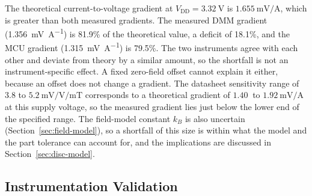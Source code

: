 \documentclass[12pt,a4paper]{article}
\begin{document}
\begin{figure}[H]
\begin{minipage}[t]{0.48\textwidth}

        \label{fig:current-cross-val}

    \end{minipage}
\end{figure}

The theoretical current-to-voltage gradient at $V_{\text{DD}} = \SI{3.32}{\volt}$ is $\SI{1.655}{\milli\volt\per\ampere}$, which is greater than both measured gradients. The measured DMM gradient (\SI{1.356}{\milli\volt\per\ampere}) is 81.9\% of the theoretical value, a deficit of 18.1\%, and the MCU gradient (\SI{1.315}{\milli\volt\per\ampere}) is 79.5\%. The two instruments agree with each other and deviate from theory by a similar amount, so the shortfall is not an instrument-specific effect. A fixed zero-field offset cannot explain it either, because an offset does not change a gradient. The datasheet sensitivity range of 3.8 to $\SI{5.2}{\milli\volt\per\volt\per\milli\tesla}$ corresponds to a theoretical gradient of $\SI{1.40}{}$ to $\SI{1.92}{\milli\volt\per\ampere}$ at this supply voltage, so the measured gradient lies just below the lower end of the specified range. The field-model constant $k_B$ is also uncertain (Section~\ref{sec:field-model}), so a shortfall of this size is within what the model and the part tolerance can account for, and the implications are discussed in Section~\ref{sec:disc-model}.

\subsection{Instrumentation Validation}
\label{sec:instr-validation}
\end{document}
